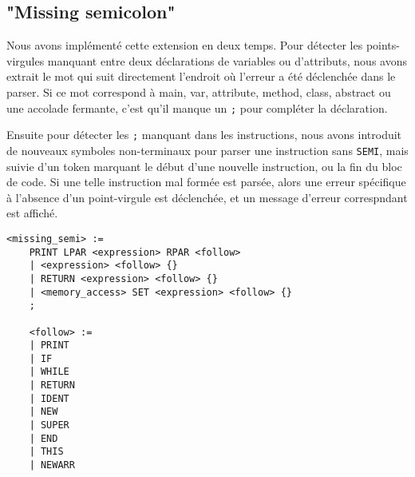 \documentclass{article}
\begin{document}
\subsection{"Missing semicolon"}
Nous avons implémenté cette extension en deux temps. Pour détecter les points-virgules manquant entre deux déclarations de variables ou d'attributs, nous avons extrait le mot qui suit directement l'endroit où l'erreur a été déclenchée dans le parser. Si ce mot correspond à main, var, attribute, method, class, abstract ou une accolade fermante, c'est qu'il manque un \texttt{;} pour compléter la déclaration.

Ensuite pour détecter les \texttt{;} manquant dans les instructions, nous avons introduit de nouveaux symboles non-terminaux pour parser une instruction sans \texttt{SEMI}, mais suivie d'un token marquant le début d'une nouvelle instruction, ou la fin du bloc de code. Si une telle instruction mal formée est parsée, alors une erreur spécifique à l'absence d'un point-virgule est déclenchée, et un message d'erreur correspndant est affiché. 
\begin{lstlisting}[style=mystyle]
    <missing_semi> :=
    PRINT LPAR <expression> RPAR <follow>
    | <expression> <follow> {}
    | RETURN <expression> <follow> {}
    | <memory_access> SET <expression> <follow> {}
    ;
    
    <follow> :=
    | PRINT
    | IF
    | WHILE
    | RETURN
    | IDENT
    | NEW
    | SUPER
    | END
    | THIS
    | NEWARR
\end{lstlisting}
\end{document}
